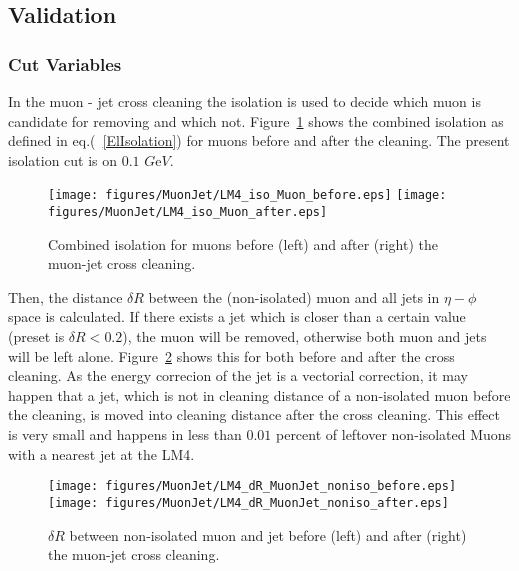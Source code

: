 \documentclass{cmspaper}
\begin{document}
\subsection{Validation}
\subsubsection{Cut Variables}
In the muon - jet cross cleaning the isolation is used to decide which muon is
candidate for removing and which not. Figure~\ref{fig:MuonIsolation} shows the
combined isolation as defined in eq.(~\ref{ElIsolation}) for muons before and
after the cleaning. The present isolation cut is on \(0.1\) \(G\)e\(V\). 

\begin{figure}[hb]
\begin{center}
    \texttt{[image: figures/MuonJet/LM4\_iso\_Muon\_before.eps]}
    \texttt{[image: figures/MuonJet/LM4\_iso\_Muon\_after.eps]}
    \caption{Combined isolation for muons before (left) and after (right) the
    muon-jet cross cleaning.}
\label{fig:MuonIsolation}
\end{center}
\end{figure}


Then, the distance \(\delta R\) between the (non-isolated) muon and all jets in
\(\eta - \phi\) space is calculated. If there exists a jet which is closer than
a certain value (preset is \(\delta R < 0.2\)), the muon will be removed,
otherwise both muon and jets will be left alone.
Figure~\ref{fig:dR_MuonJet_noniso} shows this for both before and after the cross
cleaning. As the energy correcion of the jet is a vectorial correction, it may
happen that a jet, which is not in cleaning distance of a non-isolated muon
before the cleaning, is moved into cleaning distance after the cross cleaning.
This effect is very small and happens in less than \(0.01\) percent of leftover non-isolated Muons with a nearest jet at the LM4.

\begin{figure}[hb]
\begin{center}
    \texttt{[image: figures/MuonJet/LM4\_dR\_MuonJet\_noniso\_before.eps]}
    \texttt{[image: figures/MuonJet/LM4\_dR\_MuonJet\_noniso\_after.eps]}
    \caption{\(\delta R\) between non-isolated muon and jet before (left) and
    after (right) the muon-jet cross cleaning.}
\label{fig:dR_MuonJet_noniso}
\end{center}
\end{figure}
\end{document}
